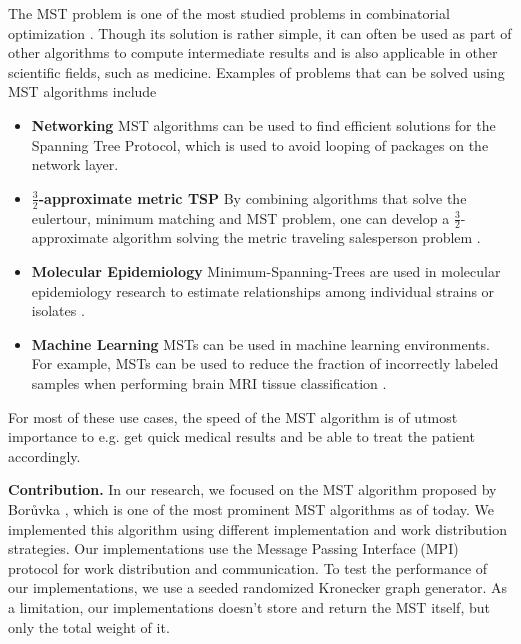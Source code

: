 \documentclass[letterpaper]{article}
\newcommand{\mypar}[1]{{\bf #1.}}
\begin{document}
The MST problem is one of the most studied problems in combinatorial optimization \cite{graham1985history}. Though its
solution is rather simple, it can often be used as part of other algorithms to compute intermediate results and is also
applicable in other scientific fields, such as medicine. Examples of problems that can be solved using MST algorithms
include
\begin{itemize}
  \item \textbf{Networking} MST algorithms can be used to find efficient solutions for the Spanning Tree Protocol, which
    is used to avoid looping of packages on the network layer.
  \item \textbf{$\frac{3}{2}$-ap\-prox\-i\-mate metric TSP} By combining algorithms that solve the eulertour, minimum
    matching and MST problem, one can develop a $\frac{3}{2}$-ap\-prox\-i\-mate algorithm solving the metric traveling
    salesperson problem \cite{christofides1976worst}.
  \item \textbf{Molecular Epidemiology} Minimum-Spanning-Trees are used in molecular epidemiology research to estimate
    relationships among individual strains or isolates \cite{spada2004use, salipante2011inadequacies}.
  \item \textbf{Machine Learning} MSTs can be used in machine learning environments. For example, MSTs can be used to
    reduce the fraction of incorrectly labeled samples when performing brain MRI tissue classification
    \cite{cocosco2003fully}.
\end{itemize}
For most of these use cases, the speed of the MST algorithm is of utmost importance to e.g. get quick medical results
and be able to treat the patient accordingly.

\mypar{Contribution}
In our research, we focused on the MST algorithm proposed by Bor\r{u}vka \cite{boruuvka1926jistem,
nevsetvril2001otakar}, which is one of the most prominent MST algorithms as of today. We implemented this algorithm
using different implementation and work distribution strategies. Our implementations use the Message Passing Interface
(MPI) protocol for work distribution and communication. To test the performance of our implementations, we use a seeded
randomized Kronecker graph generator.
As a limitation, our implementations doesn't store and return the MST itself, but only the total weight of it.
\end{document}

